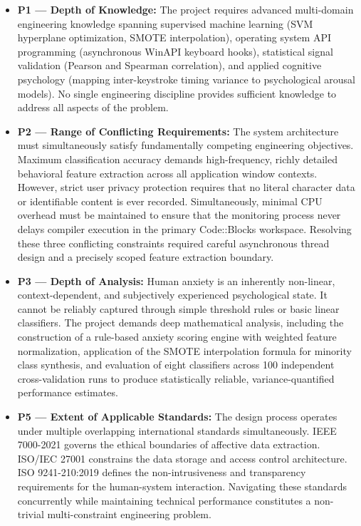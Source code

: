 \begin{itemize}
    \item \textbf{P1 — Depth of Knowledge:} The project requires advanced multi-domain engineering knowledge spanning supervised machine learning (SVM hyperplane optimization, SMOTE interpolation), operating system API programming (asynchronous WinAPI keyboard hooks), statistical signal validation (Pearson and Spearman correlation), and applied cognitive psychology (mapping inter-keystroke timing variance to psychological arousal models). No single engineering discipline provides sufficient knowledge to address all aspects of the problem.

    \item \textbf{P2 — Range of Conflicting Requirements:} The system architecture must simultaneously satisfy fundamentally competing engineering objectives. Maximum classification accuracy demands high-frequency, richly detailed behavioral feature extraction across all application window contexts. However, strict user privacy protection requires that no literal character data or identifiable content is ever recorded. Simultaneously, minimal CPU overhead must be maintained to ensure that the monitoring process never delays compiler execution in the primary Code::Blocks workspace. Resolving these three conflicting constraints required careful asynchronous thread design and a precisely scoped feature extraction boundary.

    \item \textbf{P3 — Depth of Analysis:} Human anxiety is an inherently non-linear, context-dependent, and subjectively experienced psychological state. It cannot be reliably captured through simple threshold rules or basic linear classifiers. The project demands deep mathematical analysis, including the construction of a rule-based anxiety scoring engine with weighted feature normalization, application of the SMOTE interpolation formula for minority class synthesis, and evaluation of eight classifiers across 100 independent cross-validation runs to produce statistically reliable, variance-quantified performance estimates.

    \item \textbf{P5 — Extent of Applicable Standards:} The design process operates under multiple overlapping international standards simultaneously. IEEE 7000-2021 governs the ethical boundaries of affective data extraction. ISO/IEC 27001 constrains the data storage and access control architecture. ISO 9241-210:2019 defines the non-intrusiveness and transparency requirements for the human-system interaction. Navigating these standards concurrently while maintaining technical performance constitutes a non-trivial multi-constraint engineering problem.


\end{itemize}
